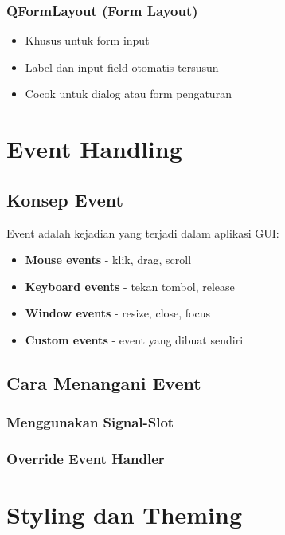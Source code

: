 \subsubsection{QFormLayout (Form Layout)}
\begin{itemize}
\item Khusus untuk form input
\item Label dan input field otomatis tersusun
\item Cocok untuk dialog atau form pengaturan
\end{itemize}

\section{Event Handling}

\subsection{Konsep Event}

Event adalah kejadian yang terjadi dalam aplikasi GUI:
\begin{itemize}
\item \textbf{Mouse events} - klik, drag, scroll
\item \textbf{Keyboard events} - tekan tombol, release
\item \textbf{Window events} - resize, close, focus
\item \textbf{Custom events} - event yang dibuat sendiri
\end{itemize}

\subsection{Cara Menangani Event}

\subsubsection{Menggunakan Signal-Slot}


\subsubsection{Override Event Handler}


\section{Styling dan Theming}

